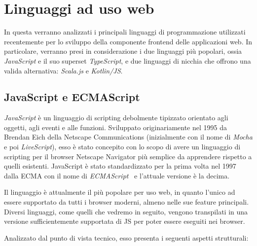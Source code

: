   \section{Linguaggi ad uso web}\label{sec:lang}
    In questa  verranno analizzati i principali linguaggi di programmazione utilizzati recentemente per lo sviluppo della componente frontend delle applicazioni web.
    In particolare, verranno presi in considerazione i due linguaggi più popolari, ossia \emph{JavaScript} e il suo superset \emph{TypeScript}, e due linguaggi di nicchia che offrono una valida alternativa: \emph{Scala.js} e \emph{Kotlin/JS}\@.

    \subsection{JavaScript e ECMAScript}\label{subsec:js}

    \emph{JavaScript} è un linguaggio di scripting debolmente tipizzato orientato agli oggetti, agli eventi e alle funzioni.
    Sviluppato originariamente nel 1995 da Brendan Eich della Netscape Communications (inizialmente con il nome di \emph{Mocha} e poi \emph{LiveScript}),
    esso è stato concepito con lo scopo di avere un linguaggio di scripting per il browser Netscape Navigator più semplice da apprendere rispetto a quelli esistenti.
    JavaScript è stato standardizzato per la prima volta nel 1997 dalla ECMA con il nome di \emph{ECMAScript}~\cite{ECMA-262,ISO:1998} e l'attuale versione è la decima.

    Il linguaggio è attualmente il più popolare per uso web, in quanto l'unico ad essere supportato da tutti i browser moderni, almeno nelle sue feature principali.
    Diversi linguaggi, come quelli che vedremo in seguito, vengono transpilati in una versione sufficientemente supportata di JS per poter essere eseguiti nei browser.

    Analizzato dal punto di vista tecnico, esso presenta i seguenti aspetti strutturali:


